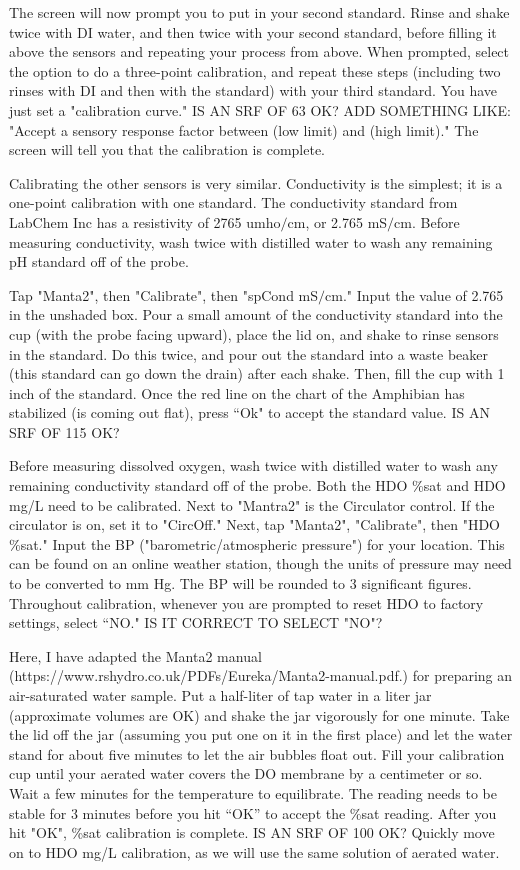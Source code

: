 \documentclass[12pt]{../SOP3}\usepackage[]{graphicx}\usepackage[]{color}
\begin{document}
\NP The screen will now prompt you to put in your second standard. Rinse and shake twice with DI water, and then twice with your second standard, before filling it above the sensors and repeating your process from above. When prompted, select the option to do a three-point calibration, and repeat these steps (including two rinses with DI and then with the standard) with your third standard. You have just set a "calibration curve." IS AN SRF OF 63 OK? ADD SOMETHING LIKE: "Accept a sensory response factor between (low limit) and (high limit)." The screen will tell you that the calibration is complete.

\NP Calibrating the other sensors is very similar. Conductivity is the simplest; it is a one-point calibration with one standard. The conductivity standard from LabChem Inc has a resistivity of 2765 umho$/$cm, or 2.765 mS$/$cm.  Before measuring conductivity, wash twice with distilled water to wash any remaining pH standard off of the probe. 

\NP Tap "Manta2", then "Calibrate", then "spCond mS$/$cm." Input the value of 2.765 in the unshaded box. Pour a small amount of the conductivity standard into the cup (with the probe facing upward), place the lid on, and shake to rinse sensors in the standard. Do this twice, and pour out the standard into a waste beaker (this standard can go down the drain) after each shake. Then, fill the cup with 1 inch of the standard. Once the red line on the chart of the Amphibian has stabilized (is coming out flat), press ``Ok" to accept the standard value. IS AN SRF OF 115 OK?

\NP Before measuring dissolved oxygen, wash twice with distilled water to wash any remaining conductivity standard off of the probe. Both the HDO \%sat and HDO mg/L need to be calibrated. Next to "Mantra2" is the Circulator control. If the circulator is on, set it to "CircOff." Next, tap "Manta2", "Calibrate", then "HDO \%sat." Input the BP ("barometric/atmospheric pressure") for your location. This can be found on an online weather station, though the units of pressure may need to be converted to mm Hg. The BP will be rounded to 3 significant figures. Throughout calibration, whenever you are prompted to reset HDO to factory settings, select “NO." IS IT CORRECT TO SELECT "NO"? 

\NP Here, I have adapted the Manta2 manual (https://www.rshydro.co.uk/PDFs/Eureka/Manta2-manual.pdf.) for preparing an air-saturated water sample. Put a half-liter of tap water in a liter jar (approximate volumes are OK) and shake the jar vigorously for one minute. Take the lid off the jar (assuming you put one on it in the first place) and let the water stand for about five minutes to let the air bubbles float out. Fill your calibration cup until your aerated water covers the DO membrane by a centimeter or so. Wait a few minutes for the temperature to equilibrate. The reading needs to be stable for 3 minutes before you hit “OK” to accept the \%sat reading. After you hit "OK", \%sat calibration is complete. IS AN SRF OF 100 OK? Quickly move on to HDO mg/L calibration, as we will use the same solution of aerated water. 
\end{document}

